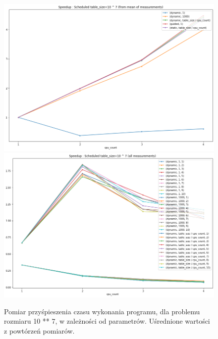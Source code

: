 \documentclass{article}
\begin{document}
        \begin{figure}[h!]
            \centering
            \includegraphics[width=17cm]{report2/images/TableSize/ex3_tb7_speedup.png}
            \includegraphics[width=17cm]{report2/images/TableSize/ex3_tb7_speedup_all.png}
            \caption{Pomiar przyśpieszenia czasu wykonania programu, dla problemu rozmiaru 10 ** 7, w zależności od parametrów. Uśrednione wartości z powtórzeń pomiarów. }
        \end{figure}
        \newpage
\end{document}
